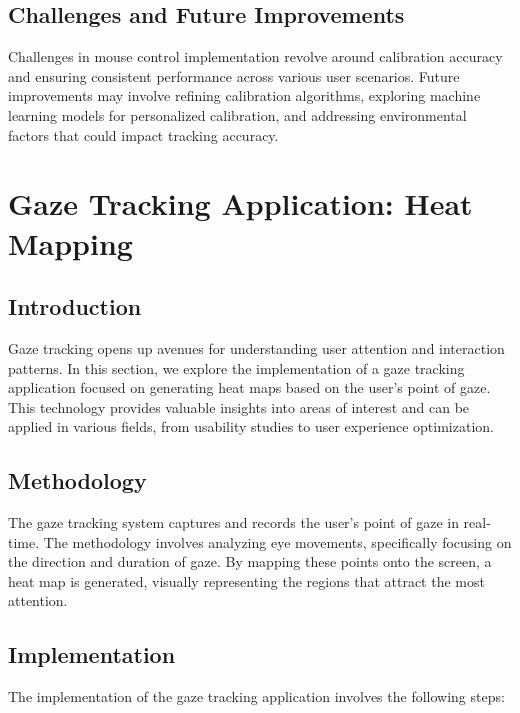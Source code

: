 \documentclass[letterpaper, 10 pt, conference]{ieeeconf}  %
\begin{document}
\subsection{Challenges and Future Improvements}

Challenges in mouse control implementation revolve around calibration accuracy and ensuring consistent performance across various user scenarios. Future improvements may involve refining calibration algorithms, exploring machine learning models for personalized calibration, and addressing environmental factors that could impact tracking accuracy.



\section{Gaze Tracking Application: Heat Mapping}

\subsection{Introduction}

Gaze tracking opens up avenues for understanding user attention and interaction patterns. In this section, we explore the implementation of a gaze tracking application focused on generating heat maps based on the user's point of gaze. This technology provides valuable insights into areas of interest and can be applied in various fields, from usability studies to user experience optimization.

\subsection{Methodology}

The gaze tracking system captures and records the user's point of gaze in real-time. The methodology involves analyzing eye movements, specifically focusing on the direction and duration of gaze. By mapping these points onto the screen, a heat map is generated, visually representing the regions that attract the most attention.

\subsection{Implementation}

The implementation of the gaze tracking application involves the following steps:
\end{document}
